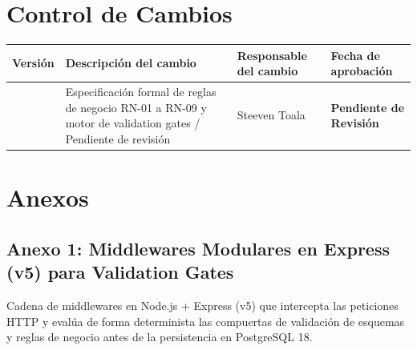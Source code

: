 \documentclass[12pt,a4paper]{article}
\begin{document}
\vspace{0.4cm}

\section{Control de Cambios}

\noindent
\renewcommand{\arraystretch}{1.2}
\begin{tabularx}{\textwidth}{|>{\hsize=0.45\hsize\centering\arraybackslash}X|>{\hsize=1.55\hsize\raggedright\arraybackslash}X|>{\hsize=1.2\hsize\raggedright\arraybackslash}X|>{\hsize=0.8\hsize\centering\arraybackslash}X|}
    \hline
    \rowcolor{gray!20}
    \textbf{Versión} & \textbf{Descripción del cambio} & \textbf{Responsable del cambio} & \textbf{Fecha de aprobación} \\
    \hline
    1.0 & Especificación formal de reglas de negocio RN-01 a RN-09 y motor de validation gates / Pendiente de revisión & Steeven Toala & \textbf{\textcolor{gray!90}{Pendiente de Revisión}} \\
    \hline
\end{tabularx}

\vspace{0.4cm}

\section{Anexos}
\subsection*{Anexo 1: Middlewares Modulares en Express (v5) para Validation Gates}
Cadena de middlewares en Node.js + Express (v5) que intercepta las peticiones HTTP y evalúa de forma determinista las compuertas de validación de esquemas y reglas de negocio antes de la persistencia en PostgreSQL 18.
\end{document}
